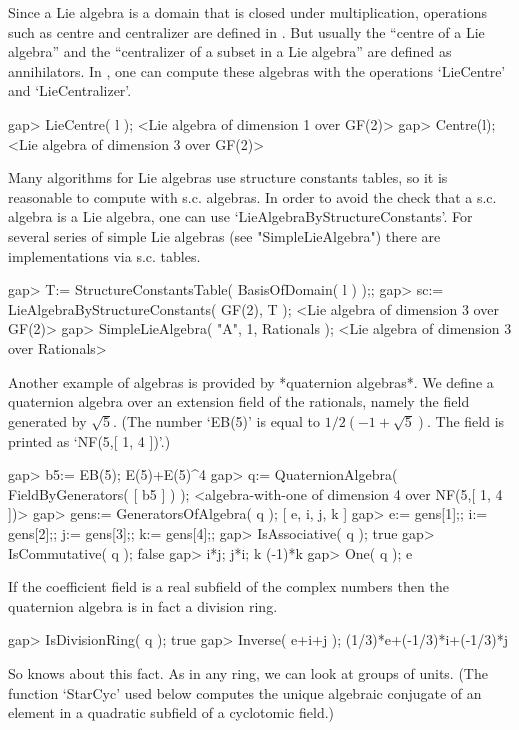 Since a Lie algebra is a domain that is closed under multiplication,
operations such as centre and centralizer are defined in {\GAP}.
But usually the ``centre of a Lie algebra'' and the ``centralizer of a
subset in a Lie algebra'' are defined as annihilators.
In {\GAP}, one can compute these algebras with the operations `LieCentre'
and `LieCentralizer'.

\beginexample
    gap> LieCentre( l );
    <Lie algebra of dimension 1 over GF(2)>
    gap> Centre(l);
    <Lie algebra of dimension 3 over GF(2)>
\endexample

Many algorithms for Lie algebras use structure constants tables,
so it is reasonable to compute with s.c. algebras.
In order to avoid the check that a s.c. algebra is a Lie algebra,
one can use `LieAlgebraByStructureConstants'.
For several series of simple Lie algebras (see "SimpleLieAlgebra")
there are implementations via s.c. tables.

\beginexample
    gap> T:= StructureConstantsTable( BasisOfDomain( l ) );;
    gap> sc:= LieAlgebraByStructureConstants( GF(2), T );
    <Lie algebra of dimension 3 over GF(2)>
    gap> SimpleLieAlgebra( "A", 1, Rationals );
    <Lie algebra of dimension 3 over Rationals>
\endexample

Another example of algebras is provided by *quaternion algebras*.
We define a quaternion algebra over an extension field of the
rationals, namely the field generated by $\sqrt{5}$.
(The number `EB(5)' is equal to $1/2 (-1+\sqrt{5})$.
The field is printed as `NF(5,[ 1, 4 ])'.)

\beginexample
    gap> b5:= EB(5);
    E(5)+E(5)^4
    gap> q:= QuaternionAlgebra( FieldByGenerators( [ b5 ] ) );
    <algebra-with-one of dimension 4 over NF(5,[ 1, 4 ])>
    gap> gens:= GeneratorsOfAlgebra( q );
    [ e, i, j, k ]
    gap> e:= gens[1];; i:= gens[2];; j:= gens[3];; k:= gens[4];;
    gap> IsAssociative( q );
    true
    gap> IsCommutative( q );
    false
    gap> i*j; j*i;
    k
    (-1)*k
    gap> One( q );
    e
\endexample

If the coefficient field is a real subfield of the complex numbers
then the quaternion algebra is in fact a division ring.

\beginexample
    gap> IsDivisionRing( q );
    true
    gap> Inverse( e+i+j );
    (1/3)*e+(-1/3)*i+(-1/3)*j
\endexample

So {\GAP} knows about this fact.
As in any ring, we can look at groups of units.
(The function `StarCyc' used below computes the unique algebraic
conjugate of an element in a quadratic subfield of a cyclotomic field.)

